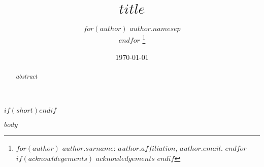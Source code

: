 \documentclass[$journal$]{AEA}
\begin{document}
\title{$title$}
$if(short)$$endif$


\author{
$for(author)$
  $author.name$$sep$\\
$endfor$
\thanks{
$for(author)$
  $author.surname$: $author.affiliation$, \href{mailto:$author.email$}{$author.email$}.
$endfor$
$if(acknowldegements)$
  $acknowledgements$
$endif$
}
}

\date{\today}

\begin{abstract}
$abstract$
\end{abstract}


\maketitle

$body$
\end{document}
